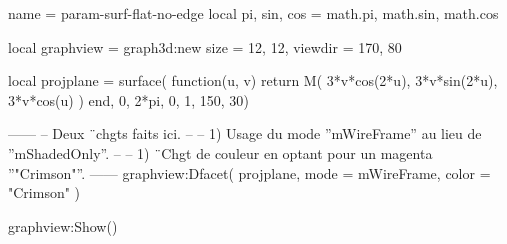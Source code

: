 \documentclass{standalone}
\begin{document}
\begin{luadraw}{name = param-surf-flat-no-edge}
local pi, sin, cos = math.pi, math.sin, math.cos

local graphview = graph3d:new{
  size    = {12, 12},
  viewdir = {170, 80}
}

local projplane =  surface(
  function(u, v)
    return M(
      3*v*cos(2*u),
      3*v*sin(2*u),
      3*v*cos(u)
    )
  end,
  0, 2*pi, 0, 1,
  {150, 30})

------
-- Deux ¨chgts faits ici.
--
--     1) Usage du mode ''mWireFrame'' au lieu de ''mShadedOnly''.
--
--     1) ¨Chgt de couleur en optant pour un magenta ''"Crimson"''.
------
graphview:Dfacet(
  projplane,
  {
    mode  = mWireFrame,
    color = "Crimson"
  })

graphview:Show()
\end{luadraw}
\end{document}
